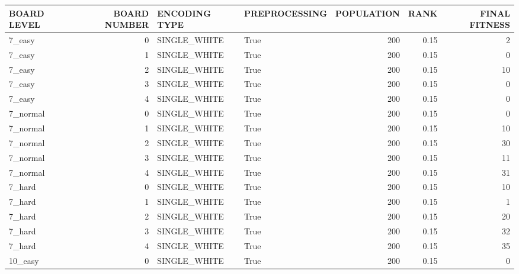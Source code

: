 \begin{tabular}{lrllrrr}
\hline
 BOARD LEVEL   &   BOARD NUMBER & ENCODING TYPE   & PREPROCESSING   &   POPULATION &   RANK &   FINAL FITNESS \\
\hline
 7\_easy        &              0 & SINGLE\_WHITE    & True            &          200 &   0.15 &               2 \\
 7\_easy        &              1 & SINGLE\_WHITE    & True            &          200 &   0.15 &               0 \\
 7\_easy        &              2 & SINGLE\_WHITE    & True            &          200 &   0.15 &              10 \\
 7\_easy        &              3 & SINGLE\_WHITE    & True            &          200 &   0.15 &               0 \\
 7\_easy        &              4 & SINGLE\_WHITE    & True            &          200 &   0.15 &               0 \\
 7\_normal      &              0 & SINGLE\_WHITE    & True            &          200 &   0.15 &               0 \\
 7\_normal      &              1 & SINGLE\_WHITE    & True            &          200 &   0.15 &              10 \\
 7\_normal      &              2 & SINGLE\_WHITE    & True            &          200 &   0.15 &              30 \\
 7\_normal      &              3 & SINGLE\_WHITE    & True            &          200 &   0.15 &              11 \\
 7\_normal      &              4 & SINGLE\_WHITE    & True            &          200 &   0.15 &              31 \\
 7\_hard        &              0 & SINGLE\_WHITE    & True            &          200 &   0.15 &              10 \\
 7\_hard        &              1 & SINGLE\_WHITE    & True            &          200 &   0.15 &               1 \\
 7\_hard        &              2 & SINGLE\_WHITE    & True            &          200 &   0.15 &              20 \\
 7\_hard        &              3 & SINGLE\_WHITE    & True            &          200 &   0.15 &              32 \\
 7\_hard        &              4 & SINGLE\_WHITE    & True            &          200 &   0.15 &              35 \\
 10\_easy       &              0 & SINGLE\_WHITE    & True            &          200 &   0.15 &               0 \\

\end{tabular}

